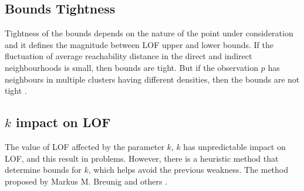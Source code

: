 \subsection{Bounds Tightness} Tightness of the bounds depends on the nature of the point under consideration and it defines the magnitude between LOF upper and lower bounds. If the fluctuation of average reachability distance in the direct and indirect neighbourhoods is small, then bounds are tight. But if the observation $p$ has neighbours in multiple clusters having different densities, then the bounds are not tight \citep{Markus}.
\subsection{$k$ impact on LOF} The value of LOF affected by the parameter $k$, $k$ has unpredictable impact on LOF, and this result in problems. However, there is a heuristic method that determine bounds for $k$, which helps avoid the previous weakness. The method proposed by Markus M. Breunig and others \citep{Markus}.

